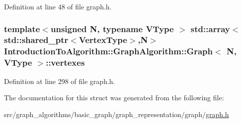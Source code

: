 Definition at line 48 of file graph.\+h.

\hypertarget{struct_introduction_to_algorithm_1_1_graph_algorithm_1_1_graph_aea254564996a6a172f001ebf7f3c5f65}{}
\subsubsection[{vertexes}]{\setlength{\rightskip}{0pt plus 5cm}template$<$unsigned N, typename V\+Type $>$ std\+::array$<$std\+::shared\+\_\+ptr$<${\bf Vertex\+Type}$>$,N$>$ {\bf Introduction\+To\+Algorithm\+::\+Graph\+Algorithm\+::\+Graph}$<$ N, V\+Type $>$\+::vertexes}\label{struct_introduction_to_algorithm_1_1_graph_algorithm_1_1_graph_aea254564996a6a172f001ebf7f3c5f65}


Definition at line 298 of file graph.\+h.



The documentation for this struct was generated from the following file\+:\begin{DoxyCompactItemize}
\item 
src/graph\+\_\+algorithms/basic\+\_\+graph/graph\+\_\+representation/graph/\hyperlink{graph_8h}{graph.\+h}\end{DoxyCompactItemize}
